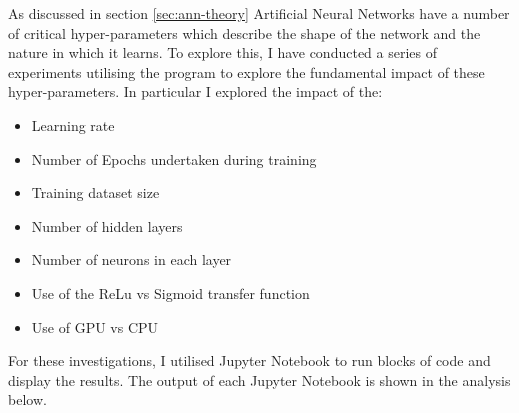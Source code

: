 \documentclass[./project-report/src/latex/project-report.tex]{subfiles}
\begin{document}
As discussed in section \ref{sec:ann-theory} Artificial Neural Networks have a number of critical hyper-parameters which describe the shape of the network and the nature in 
which it learns. To explore this, I have conducted a series of experiments utilising the program to explore the fundamental impact of these hyper-parameters. In particular I 
explored the impact of the:

\begin{itemize}
    \item Learning rate
    \item Number of Epochs undertaken during training
    \item Training dataset size
    \item Number of hidden layers
    \item Number of neurons in each layer
    \item Use of the ReLu vs Sigmoid transfer function
    \item Use of GPU vs CPU 
\end{itemize}

For these investigations, I utilised Jupyter Notebook to run blocks of code and display the results. The output of each Jupyter Notebook is shown in the 
analysis below.





\label{sec:train-dataset-size-analysis}



\label{sec:layer-count-analysis}



\label{sec:neuron-count-analysis}



\label{sec:relu-analysis}


\end{document}
